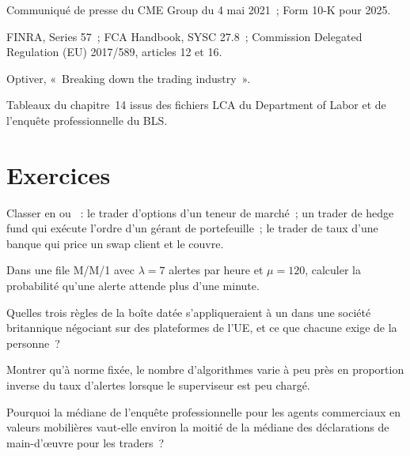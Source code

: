 \begin{omsources}
\item Communiqué de presse du CME Group du 4 mai 2021~; Form 10-K pour 2025.
\item FINRA, Series 57~; FCA Handbook, SYSC 27.8~; Commission Delegated Regulation (EU) 2017/589, articles 12 et 16.
\item Optiver, «~Breaking down the trading industry~».
\item Tableaux du chapitre~14 issus des fichiers LCA du Department of Labor et de l'enquête professionnelle du BLS.
\end{omsources}

\section{Exercices}

\begin{exercise}[$\star$]\label{exo:in:trader:1}
Classer en  ou ~: le trader d'options d'un teneur de marché~; un trader de hedge fund qui exécute l'ordre d'un gérant de portefeuille~;
le trader de taux d'une banque qui price un swap client et le couvre.
\end{exercise}

\begin{exercise}[$\star$]\label{exo:in:trader:2}
Dans une file M/M/1 avec $\lambda=7$ alertes par heure et $\mu=120$, calculer la probabilité qu'une alerte attende plus d'une
minute.
\end{exercise}

\begin{exercise}[$\star$]\label{exo:in:trader:3}
Quelles trois règles de la boîte datée s'appliqueraient à un  dans une société britannique négociant sur des plateformes de l'UE, et
ce que chacune exige de la personne~?
\end{exercise}

\begin{exercise}[$\star\star$]\label{exo:in:trader:4}
Montrer qu'à norme fixée, le nombre d'algorithmes varie à peu près en proportion inverse du taux d'alertes lorsque le
superviseur est peu chargé.
\end{exercise}

\begin{exercise}[$\star\star$]\label{exo:in:trader:5}
Pourquoi la médiane de l'enquête professionnelle pour les agents commerciaux en valeurs mobilières vaut-elle environ la moitié de la médiane des déclarations de main-d'œuvre pour les traders~?
\end{exercise}

